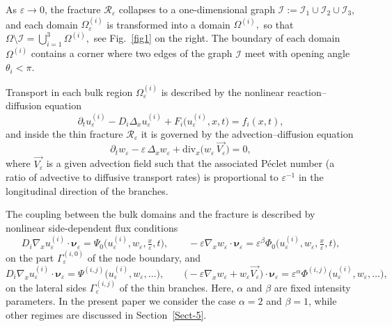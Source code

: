 \documentclass[reqno]{amsart}            %
\numberwithin{equation}{section}
\begin{document}
	As $\varepsilon\to0$, the fracture $\mathcal{R}_\varepsilon$ collapses to a one-dimensional graph
	$\mathcal{I}:=\mathcal{I}_1\cup\mathcal{I}_2\cup\mathcal{I}_3,$
	and each domain $\Omega_\varepsilon^{(i)}$ is transformed into a domain $\Omega^{(i)},$ so that $\Omega\setminus\mathcal{I}=\bigcup_{i=1}^{3}\Omega^{(i)},$ see Fig.~\ref{fig1} on the right. The boundary of each domain $\Omega^{(i)}$ contains a corner where two edges of the graph $\mathcal{I}$ meet with opening angle $\theta_i < \pi$.
	
	Transport in each bulk region $\Omega_\varepsilon^{(i)}$ is described by the nonlinear reaction--diffusion equation
	\[
	\partial_t u_\varepsilon^{(i)} - D_i \Delta_x u_\varepsilon^{(i)}
	+ F_i\big(u_\varepsilon^{(i)}, x, t\big) = f_i(x,t),
	\]
	and inside the thin fracture $\mathcal{R}_\varepsilon$ it is governed by the advection--diffusion equation
	\[
	\partial_t w_\varepsilon - \varepsilon\, \Delta_x w_\varepsilon +
	\mathrm{div}_x\big(w_\varepsilon\, \overrightarrow{V_\varepsilon}\big)
	= 0,
	\]
	where $\overrightarrow{V_\varepsilon}$ is a given advection field such that the associated Péclet number (a ratio of advective to diffusive transport rates) is proportional to $\varepsilon^{-1}$ in the
	longitudinal direction of the branches. 
	
	
	The coupling between the bulk domains and the fracture is described by nonlinear side-dependent flux conditions
	\begin{equation}\label{int-1}
		D_i \nabla_x u^{(i)}_{\varepsilon} \cdot \boldsymbol{\nu}_\varepsilon
		= \Psi_0\big(u^{(i)}_{\varepsilon}, w_{\varepsilon}, \tfrac{x}{\varepsilon}, t \big),
		\qquad
		- \varepsilon \nabla_x w_{\varepsilon} \cdot \boldsymbol{\nu}_\varepsilon
		= \varepsilon^{\beta} \Phi_0\big(u^{(i)}_{\varepsilon}, w_{\varepsilon},\tfrac{x}{\varepsilon}, t \big),
	\end{equation}
	on the part $\Gamma^{(i,0)}_\varepsilon$ of the node boundary, and
	\begin{equation}\label{int-2}
		D_i \nabla_x u^{(i)}_{\varepsilon} \cdot \boldsymbol{\nu}_\varepsilon
		= \Psi^{(i,j)}\big(u^{(i)}_{\varepsilon}, w_{\varepsilon}, \ldots\big),
		\qquad
		\big(-\varepsilon \nabla_x w_\varepsilon + w_\varepsilon \overrightarrow{V_\varepsilon} \big) \cdot \boldsymbol{\nu}_\varepsilon
		= \varepsilon^\alpha \Phi^{(i,j)}\big(u^{(i)}_{\varepsilon}, w_{\varepsilon}, \ldots\big),
	\end{equation}
	on the lateral sides $\Gamma^{(i,j)}_\varepsilon$ of the thin branches. Here, $\alpha$ and $\beta$ are fixed intensity parameters. In the present paper we consider the case $\alpha=2$ and $\beta=1$, while other regimes are discussed in Section~\ref{Sect-5}.
	
\end{document}
